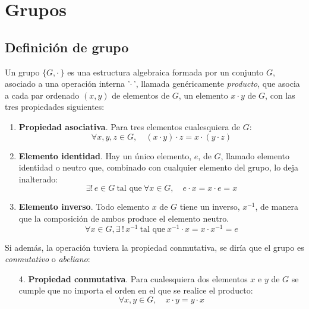 %

\chapter{Grupos}

\section{Definición de grupo}
Un grupo $\{G,\cdot\,\}$ es una estructura algebraica formada por un
conjunto $G$, asociado a una operación interna '$\cdot\,$', llamada
genéricamente \emph{producto}, que asocia a cada par ordenado
$(x,y)$ de elementos de $G$, un elemento $x\cdot y$ de $G$, con las
tres propiedades siguientes:
\begin{enumerate}
\item \textbf{Propiedad asociativa}. Para tres elementos cualesquiera de $G$:
  \begin{equation}\label{eq:gru-asociativa}
    \forall x, y, z \in G, \quad (x \cdot y) \cdot z = x \cdot (y \cdot z)
  \end{equation}
\item \textbf{Elemento identidad}. Hay un único elemento, $e$, de $G$, llamado
  elemento identidad o neutro que, combinado con cualquier elemento del grupo,
  lo deja inalterado:
  \begin{equation}\label{eq:gru-identidad}
    \exists !\, e \in G \ \text{tal que}\ \forall x \in G, \quad e \cdot x
    = x \cdot e = x
  \end{equation}
\item \textbf{Elemento inverso}. Todo elemento $x$ de $G$ tiene un
  inverso\footnotemark, $x^{-1}$, de manera que la composición de ambos
  produce el elemento neutro.
  \begin{equation}\label{eq:gru-inverso}
    \forall x \in G, \exists\, !\, x^{-1} \
    \text{tal que}\ x^{-1} \cdot x = x \cdot  x^{-1} = e
  \end{equation}
\end{enumerate}

Si además, la operación tuviera la propiedad conmutativa, se diría que
el grupo es \emph{conmutativo} o \emph{abeliano}:
\begin{enumerate}
\item[4.] \textbf{Propiedad conmutativa}. Para cualesquiera dos
  elementos $x$ e $y$ de $G$ se cumple que no importa el orden en el
  que se realice el producto:
  \begin{equation}\label{eq:gru-conmutativa}
    \forall x,y \in G, \quad x \cdot y = y \cdot x
  \end{equation}
\end{enumerate}



 
